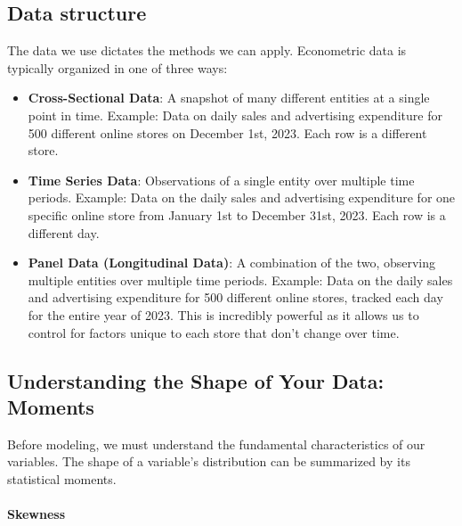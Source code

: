 \documentclass{article}
\begin{document}
\subsection{Data structure} %
\label{sub:data_structure}


The data we use dictates the methods we can apply. Econometric data is typically organized in one of three ways:

\begin{itemize}
  \item \textbf{Cross-Sectional Data}: A snapshot of many different entities at a single point in time.
  Example: Data on daily sales and advertising expenditure for 500 different online stores on December 1st, 2023. Each row is a different store.

  \item \textbf{Time Series Data}: Observations of a single entity over multiple time periods.
  Example: Data on the daily sales and advertising expenditure for one specific online store from January 1st to December 31st, 2023. Each row is a different day.

  \item \textbf{Panel Data (Longitudinal Data)}: A combination of the two, observing multiple entities over multiple time periods.
  Example: Data on the daily sales and advertising expenditure for 500 different online stores, tracked each day for the entire year of 2023. This is incredibly powerful as it allows us to control for factors unique to each store that don't change over time.
\end{itemize}



\subsection{Understanding the Shape of Your Data: Moments} %
\label{sub:understanding_the_shape_of_your_data_moments}




Before modeling, we must understand the fundamental characteristics of our variables. The shape of a variable's distribution can be summarized by its statistical moments.

\paragraph{Skewness}
\end{document}
